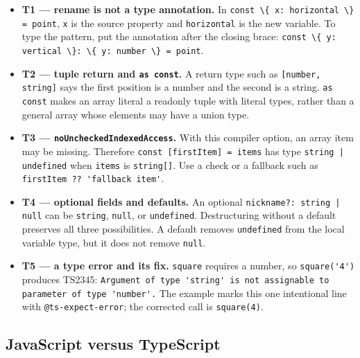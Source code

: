\documentclass[
]{article}
\newcommand{\passthrough}[1]{#1}
\providecommand{\tightlist}{%
  \setlength{\itemsep}{0pt}\setlength{\parskip}{0pt}}
\begin{document}
\begin{itemize}
\tightlist
\item
  \textbf{T1 --- rename is not a type annotation.} In
  \passthrough{\lstinline!const \{ x: horizontal \} = point!},
  \passthrough{\lstinline!x!} is the source property and
  \passthrough{\lstinline!horizontal!} is the new variable. To type the
  pattern, put the annotation after the closing brace:
  \passthrough{\lstinline!const \{ y: vertical \}: \{ y: number \} = point!}.
\item
  \textbf{T2 --- tuple return and \passthrough{\lstinline!as const!}.} A
  return type such as \passthrough{\lstinline![number, string]!} says
  the first position is a number and the second is a string.
  \passthrough{\lstinline!as const!} makes an array literal a readonly
  tuple with literal types, rather than a general array whose elements
  may have a union type.
\item
  \textbf{T3 --- \passthrough{\lstinline!noUncheckedIndexedAccess!}.}
  With this compiler option, an array item may be missing. Therefore
  \passthrough{\lstinline!const [firstItem] = items!} has type
  \passthrough{\lstinline!string | undefined!} when
  \passthrough{\lstinline!items!} is \passthrough{\lstinline!string[]!}.
  Use a check or a fallback such as
  \passthrough{\lstinline!firstItem ?? 'fallback item'!}.
\item
  \textbf{T4 --- optional fields and defaults.} An optional
  \passthrough{\lstinline!nickname?: string | null!} can be
  \passthrough{\lstinline!string!}, \passthrough{\lstinline!null!}, or
  \passthrough{\lstinline!undefined!}. Destructuring without a default
  preserves all three possibilities. A default removes
  \passthrough{\lstinline!undefined!} from the local variable type, but
  it does not remove \passthrough{\lstinline!null!}.
\item
  \textbf{T5 --- a type error and its fix.}
  \passthrough{\lstinline!square!} requires a number, so
  \passthrough{\lstinline!square('4')!} produces TS2345:
  \passthrough{\lstinline!Argument of type 'string' is not assignable to parameter of type 'number'.!}
  The example marks this one intentional line with
  \passthrough{\lstinline!@ts-expect-error!}; the corrected call is
  \passthrough{\lstinline!square(4)!}.
\end{itemize}

\subsection{JavaScript versus
TypeScript}\label{javascript-versus-typescript}
\end{document}
